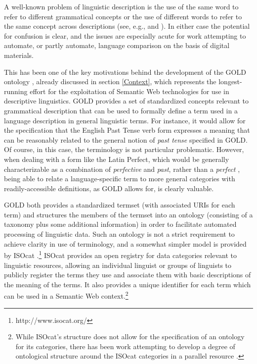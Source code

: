 \documentclass[12pt]{article}
\newcommand{\sref}[1]{section \ref{#1}}
\newcommand\namecite{\citet}
\renewcommand\cite{\citep}
\begin{document}
A well-known problem of linguistic description is the use of the same word to
refer to different grammatical concepts or the use of different words to refer
to the same concept across descriptions (see, e.g.,
\namecite[{\S}1]{CysouwEtAl:2005} and \namecite[114]{Zaefferer:2006}). In either
case the potential for confusion is clear, and the issues are especially acute
for work attempting to automate, or partly automate, language comparison on the
basis of digital materials.

This has been one of the key motivations behind the development of the
GOLD ontology
\cite{FarrarLangendoen:2003,FarrarLewis:2007,FarrarLangendoen:2009}, already
discussed in \sref{Context}, which represents the longest-running effort for the
exploitation of Semantic Web technologies for use in descriptive linguistics.
GOLD provides a set of standardized concepts relevant to grammatical description
that can be used to formally define a term used in a language description in
general linguistic terms. For instance, it would allow for the specification
that the English Past Tense verb form expresses a meaning that can be reasonably
related to the general notion of \emph{past tense} specified in GOLD. Of course,
in this case, the terminology is not particular problematic. However, when
dealing with a form like the Latin Perfect, which would be generally
characterizable as a combination of \emph{perfective} and \emph{past}, rather
than a \emph{perfect} \cite[13]{Comrie:1976}, being able to relate a
language-specific term to more general categories with readily-accessible
definitions, as GOLD allows for, is clearly valuable.

GOLD both provides a standardized termset (with associated URIs for each term)
and structures the members of the termset into an ontology (consisting of a
taxonomy plus some additional information) in order to facilitate automated
processing of linguistic data. Such an ontology is not a strict requirement to
achieve clarity in use of terminology, and a somewhat simpler model is provided
by ISOcat
\cite{KempsSnijdersEtAl:2008:LREC,KempsSnijdersEtAl:2008:ehum}.{\footnote{http://www.isocat.org/}}
ISOcat provides an open registry for data categories relevant
to linguistic resources, allowing an individual linguist or groups of linguists
to publicly register the terms they use and associate them with basic
descriptions of the meaning of the terms. It also provides a unique identifier
for each term which can be used in a Semantic Web context.{\footnote{While
ISOcat's structure does not allow for the specification of an ontology for its
categories, there has been work attempting to develop a degree of ontological
structure around the ISOcat categories in a parallel resource
\cite{WrightEtAl:2010}.}}
\end{document}

